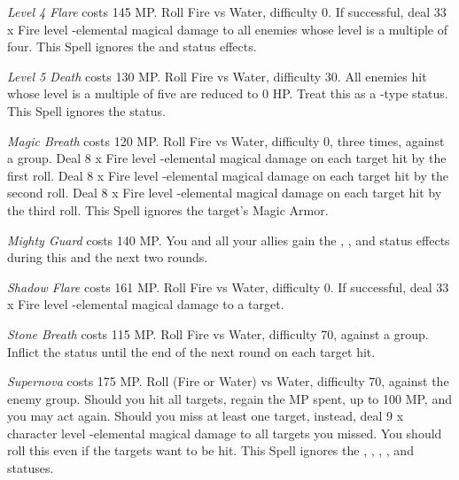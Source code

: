 \begin{multicols}{2}
    \textit{Level 4 Flare} costs 145 MP\@. Roll Fire vs Water, difficulty 0. If successful, deal 33 x Fire level -elemental magical damage to all enemies whose level is a multiple of four. This Spell ignores the  and  status effects.
    
    \textit{Level 5 Death} costs 130 MP\@. Roll Fire vs Water, difficulty 30. All enemies hit whose level is a multiple of five are reduced to 0 HP\@. Treat this as a -type status. This Spell ignores the  status.
    
    \textit{Magic Breath} costs 120 MP\@. Roll Fire vs Water, difficulty 0, three times, against a group. Deal 8 x Fire level -elemental magical damage on each target hit by the first roll. Deal 8 x Fire level -elemental magical damage on each target hit by the second roll. Deal 8 x Fire level -elemental magical damage on each target hit by the third roll. This Spell ignores the target’s Magic Armor.
    
    \textit{Mighty Guard} costs 140 MP\@. You and all your allies gain the , , and  status effects during this and the next two rounds.
    
    \textit{Shadow Flare} costs 161 MP\@. Roll Fire vs Water, difficulty 0. If successful, deal 33 x Fire level -elemental magical damage to a target.
    
    \textit{Stone Breath} costs 115 MP\@. Roll Fire vs Water, difficulty 70, against a group. Inflict the  status until the end of the next round on each target hit.
    
	\textit{Supernova} costs 175 MP\@. Roll (Fire or Water) vs Water, difficulty 70, against the enemy group. Should you hit all targets, regain the MP spent, up to 100 MP, and you may act again. Should you miss at least one target, instead, deal 9 x character level -elemental magical damage to all targets you missed. You should roll this even if the targets want to be hit. This Spell ignores the , , , ,  and  statuses.

\end{multicols}
